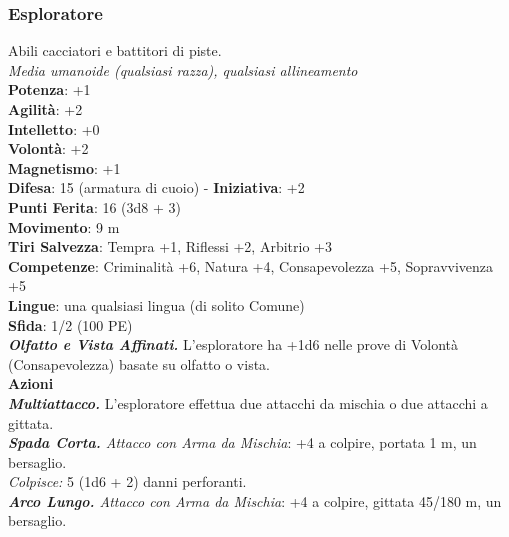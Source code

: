 \begin{multicols}{2}
\subsubsection{Esploratore}
Abili cacciatori e battitori di piste.\\
\emph{Media umanoide (qualsiasi razza), qualsiasi allineamento}\\
\textbf{Potenza}: +1\\
\textbf{Agilità}: +2\\
\textbf{Intelletto}: +0\\
\textbf{Volontà}: +2\\
\textbf{Magnetismo}: +1\\
\textbf{Difesa}: 15 (armatura di cuoio) - \textbf{Iniziativa}: +2\\
\textbf{Punti Ferita}: 16 (3d8 + 3)\\
\textbf{Movimento}: 9 m\\
\textbf{Tiri Salvezza}: Tempra +1, Riflessi +2, Arbitrio +3 \\
\textbf{Competenze}: Criminalità +6, Natura +4, Consapevolezza +5, Sopravvivenza +5\\
\textbf{Lingue}: una qualsiasi lingua (di solito Comune)\\
\textbf{Sfida}: 1/2 (100 PE)\smallskip\\
\emph{\textbf{Olfatto e Vista Affinati.}} L'esploratore ha +1d6 nelle prove di Volontà (Consapevolezza) basate su olfatto o vista.\\
\smallskip\textbf{Azioni}\\
\emph{\textbf{Multiattacco.}} L'esploratore effettua due attacchi da mischia o due attacchi a gittata.\\
\emph{\textbf{Spada Corta.} Attacco con Arma da Mischia}: +4 a colpire, portata 1 m, un bersaglio.\\
\emph{Colpisce:} 5 (1d6 + 2) danni perforanti.\\
\emph{\textbf{Arco Lungo.} Attacco con Arma da Mischia}: +4 a colpire, gittata 45/180 m, un bersaglio.\\

\end{multicols}

